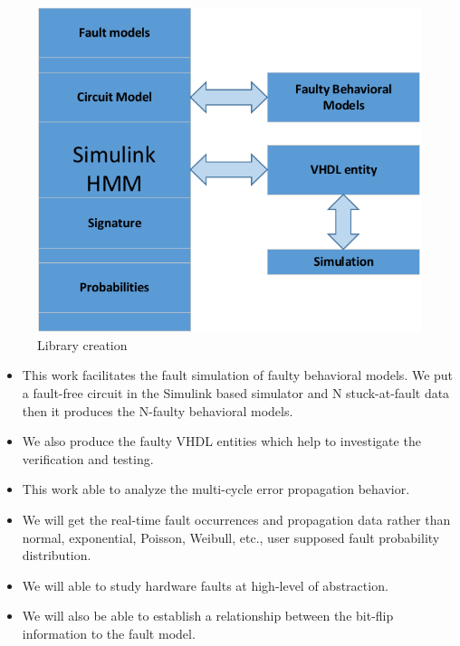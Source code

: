 \begin{figure}[tb!]

 \centering
  \captionsetup{justification=centering}    
   \includegraphics[scale=0.8]{Figures/simulink.pdf}
   \caption{Library creation}
\label{fig:lib}
\end{figure}

\begin{itemize}


\item This work facilitates the fault simulation of faulty behavioral models. We put a fault-free circuit in the Simulink based simulator and N stuck-at-fault data then it produces the N-faulty behavioral models.

\item We also produce the faulty VHDL entities which help to investigate the verification and testing.

\item This work able to analyze the multi-cycle error propagation behavior.

\item We will get the real-time fault occurrences and propagation data rather than normal, exponential, Poisson, Weibull, etc., user supposed fault probability distribution.

\item We will able to study hardware faults at high-level of abstraction.

\item We will also be able to establish a relationship between the bit-flip information to the fault model.
\end{itemize}





